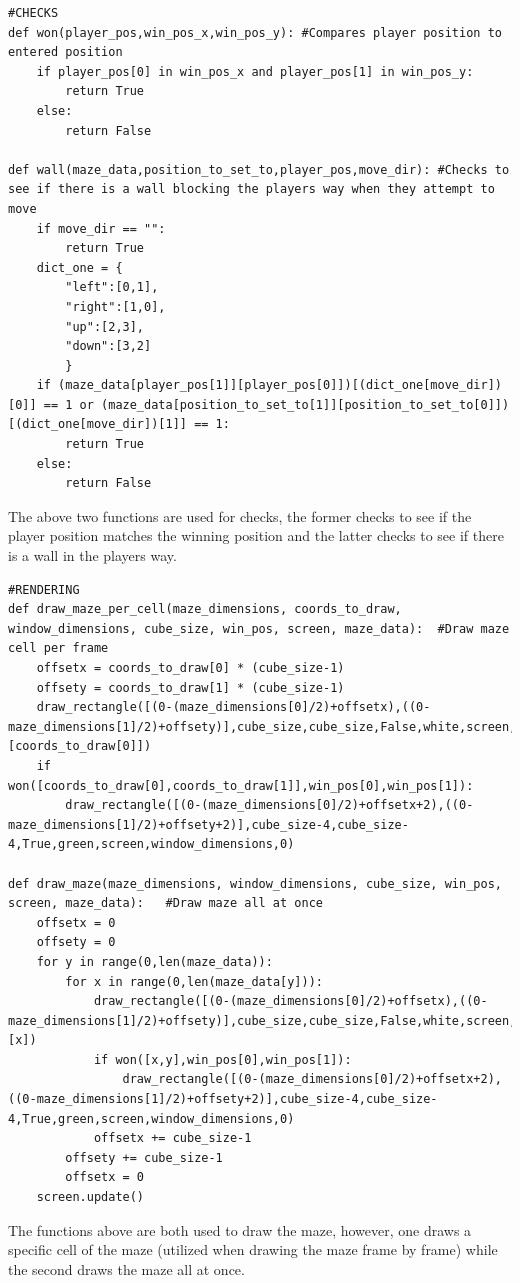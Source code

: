 \begin{lstlisting}
#CHECKS
def won(player_pos,win_pos_x,win_pos_y): #Compares player position to entered position
    if player_pos[0] in win_pos_x and player_pos[1] in win_pos_y:
        return True
    else:
        return False

def wall(maze_data,position_to_set_to,player_pos,move_dir): #Checks to see if there is a wall blocking the players way when they attempt to move
    if move_dir == "":
        return True
    dict_one = {
        "left":[0,1],
        "right":[1,0],
        "up":[2,3],
        "down":[3,2]
        }
    if (maze_data[player_pos[1]][player_pos[0]])[(dict_one[move_dir])[0]] == 1 or (maze_data[position_to_set_to[1]][position_to_set_to[0]])[(dict_one[move_dir])[1]] == 1:
        return True
    else:
        return False
\end{lstlisting}
The above two functions are used for checks, the former checks to see if the player position matches the winning position and the latter checks to see if there is a wall in the players way.

\begin{lstlisting}
#RENDERING
def draw_maze_per_cell(maze_dimensions, coords_to_draw, window_dimensions, cube_size, win_pos, screen, maze_data):  #Draw maze cell per frame
    offsetx = coords_to_draw[0] * (cube_size-1)
    offsety = coords_to_draw[1] * (cube_size-1)
    draw_rectangle([(0-(maze_dimensions[0]/2)+offsetx),((0-maze_dimensions[1]/2)+offsety)],cube_size,cube_size,False,white,screen,window_dimensions,0,maze_data[coords_to_draw[1]][coords_to_draw[0]])
    if won([coords_to_draw[0],coords_to_draw[1]],win_pos[0],win_pos[1]):
        draw_rectangle([(0-(maze_dimensions[0]/2)+offsetx+2),((0-maze_dimensions[1]/2)+offsety+2)],cube_size-4,cube_size-4,True,green,screen,window_dimensions,0)

def draw_maze(maze_dimensions, window_dimensions, cube_size, win_pos, screen, maze_data):   #Draw maze all at once
    offsetx = 0
    offsety = 0
    for y in range(0,len(maze_data)):
        for x in range(0,len(maze_data[y])):
            draw_rectangle([(0-(maze_dimensions[0]/2)+offsetx),((0-maze_dimensions[1]/2)+offsety)],cube_size,cube_size,False,white,screen,window_dimensions,0,maze_data[y][x])
            if won([x,y],win_pos[0],win_pos[1]):
                draw_rectangle([(0-(maze_dimensions[0]/2)+offsetx+2),((0-maze_dimensions[1]/2)+offsety+2)],cube_size-4,cube_size-4,True,green,screen,window_dimensions,0)
            offsetx += cube_size-1
        offsety += cube_size-1
        offsetx = 0
    screen.update() 
\end{lstlisting}
The functions above are both used to draw the maze, however, one draws a specific cell of the maze (utilized when drawing the maze frame by frame) while the second draws the maze all at once.

